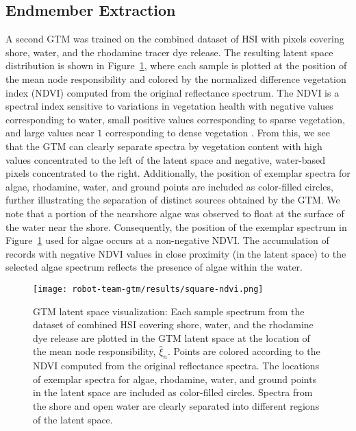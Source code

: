 \subsection{Endmember Extraction}

A second GTM was trained on the combined dataset of HSI with pixels covering shore, water, and the rhodamine tracer dye release. The resulting latent space distribution is shown in Figure~\ref{fig:gtm-ndvi}, where each sample is plotted at the position of the mean node responsibility and colored by the normalized difference vegetation index (NDVI) computed from the original reflectance spectrum. The NDVI is a spectral index sensitive to variations in vegetation health with negative values corresponding to water, small positive values corresponding to sparse vegetation, and large values near $1$ corresponding to dense vegetation \cite{thenkabail2018hyperspectral}. From this, we see that the GTM can clearly separate spectra by vegetation content with high values concentrated to the left of the latent space and negative, water-based pixels concentrated to the right. Additionally, the position of exemplar spectra for algae, rhodamine, water, and ground points are included as color-filled circles, further illustrating the separation of distinct sources obtained by the GTM. We note that a portion of the nearshore algae was observed to float at the surface of the water near the shore. Consequently, the position of the exemplar spectrum in Figure~\ref{fig:gtm-ndvi} used for algae occurs at a non-negative NDVI. The accumulation of records with negative NDVI values in close proximity (in the latent space) to the selected algae spectrum reflects the presence of algae within the water.


\begin{figure}[H]
  \vspace{-0.25cm}
  \centering
  \texttt{[image: robot-team-gtm/results/square-ndvi.png]}
  \vspace{-0.75cm}
  \caption{GTM latent space visualization: Each sample spectrum from the dataset
    of combined HSI covering shore, water, and the rhodamine dye release are
    plotted in the GTM latent space at the location of the mean node
    responsibility, $\hat{\xi}_n$. Points are colored according to the NDVI
    computed from the original reflectance spectra. The locations of exemplar
    spectra for algae, rhodamine, water, and ground points in the latent space
    are included as color-filled circles. Spectra from the shore and open water
    are clearly separated into different regions of the latent
    space.}
  \label{fig:gtm-ndvi}
\end{figure}



